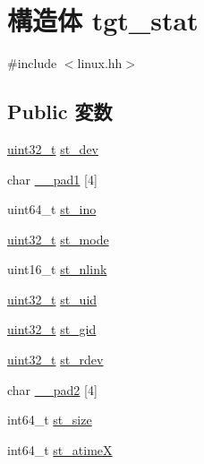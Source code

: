 \hypertarget{structSparcLinux_1_1tgt__stat}{
\section{構造体 tgt\_\-stat}
\label{structSparcLinux_1_1tgt__stat}
}


{\ttfamily \#include $<$linux.hh$>$}\subsection*{Public 変数}
\begin{DoxyCompactItemize}
\item 
\hyperlink{Type_8hh_a435d1572bf3f880d55459d9805097f62}{uint32\_\-t} \hyperlink{structSparcLinux_1_1tgt__stat_a96c0e3ea3acf24a90e33ed627147bf84}{st\_\-dev}
\item 
char \hyperlink{structSparcLinux_1_1tgt__stat_a6dfb3b1e05049a2b9b79237b99f200ae}{\_\-\_\-pad1} \mbox{[}4\mbox{]}
\item 
uint64\_\-t \hyperlink{structSparcLinux_1_1tgt__stat_abb54f0e7d91659ba9f4ab77a5392c08a}{st\_\-ino}
\item 
\hyperlink{Type_8hh_a435d1572bf3f880d55459d9805097f62}{uint32\_\-t} \hyperlink{structSparcLinux_1_1tgt__stat_a75f55d064ed3b380b0315de36e178885}{st\_\-mode}
\item 
uint16\_\-t \hyperlink{structSparcLinux_1_1tgt__stat_a57eca117f38b8e28cca30edc65cc6af8}{st\_\-nlink}
\item 
\hyperlink{Type_8hh_a435d1572bf3f880d55459d9805097f62}{uint32\_\-t} \hyperlink{structSparcLinux_1_1tgt__stat_ad5477a292a4edf27aa5766e01e0f5d1f}{st\_\-uid}
\item 
\hyperlink{Type_8hh_a435d1572bf3f880d55459d9805097f62}{uint32\_\-t} \hyperlink{structSparcLinux_1_1tgt__stat_a1faa6012541b83fd5218e2b229f876ec}{st\_\-gid}
\item 
\hyperlink{Type_8hh_a435d1572bf3f880d55459d9805097f62}{uint32\_\-t} \hyperlink{structSparcLinux_1_1tgt__stat_ac4a67c3d290b4f93d0d91b99776f4207}{st\_\-rdev}
\item 
char \hyperlink{structSparcLinux_1_1tgt__stat_a9999e22ffb02a861797c824443ac79c7}{\_\-\_\-pad2} \mbox{[}4\mbox{]}
\item 
int64\_\-t \hyperlink{structSparcLinux_1_1tgt__stat_aec608d79c93ed6d010aec9f7487e0064}{st\_\-size}
\item 
int64\_\-t \hyperlink{structSparcLinux_1_1tgt__stat_aa19619629e025e0df8313d1ea279b50b}{st\_\-atimeX}
\item 

\end{DoxyCompactItemize}
